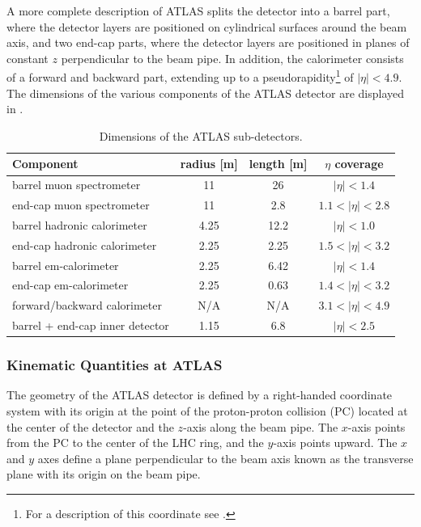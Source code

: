 A more complete description of ATLAS splits the detector
into a barrel part, where the detector layers
are positioned on cylindrical surfaces around the beam axis, and two end-cap parts,
where the detector layers are positioned in planes of constant $z$ perpendicular
to the beam pipe. In addition, the calorimeter consists of a forward 
and backward part, extending up to a pseudorapidity\footnote{For a description
of this coordinate see .} of $|\eta| < 4.9$. 
The dimensions of the various components of the ATLAS detector
are displayed in .

\begin{table}[htbp]
  \begin{center}
    \begin{tabular}{|l|ccc|}
    \hline
    Component & radius [m] & length [m] & $\eta$ coverage \\
    \hline
    barrel muon spectrometer &  11 & 26 & $|\eta| < 1.4$ \\
    end-cap muon spectrometer & 11 & 2.8 & $1.1 < |\eta| < 2.8$ \\
    \hline
    barrel hadronic calorimeter & 4.25 & 12.2 & $|\eta| < 1.0$ \\
    end-cap hadronic calorimeter & 2.25 & 2.25 & $1.5 < |\eta| < 3.2$ \\
    \hline
    barrel em-calorimeter & 2.25 & 6.42 & $|\eta| < 1.4$ \\
    end-cap em-calorimeter & 2.25 & 0.63 & $1.4 < |\eta| < 3.2$ \\
    forward/backward calorimeter & N/A & N/A & $3.1 < |\eta| < 4.9$ \\
    \hline
    barrel + end-cap inner detector & 1.15 & 6.8 & $|\eta| < 2.5$ \\
    \hline
    \end{tabular}
    \caption{Dimensions of the ATLAS sub-detectors.}
    \label{tab:atlasdim}
  \end{center}
\end{table}

\subsubsection{Kinematic Quantities at ATLAS}
\label{subsubsec:kinematics}

The geometry of the ATLAS detector is defined
by a right-handed coordinate system with its origin at the point of
the proton-proton collision (PC) located at the center of the detector 
and the $z$-axis along the beam pipe. 
The $x$-axis points from the PC to the center of the LHC 
ring, and the $y$-axis points upward. The $x$ and $y$ axes define
a plane perpendicular to the beam axis known as the transverse plane with
its origin on the beam pipe.


